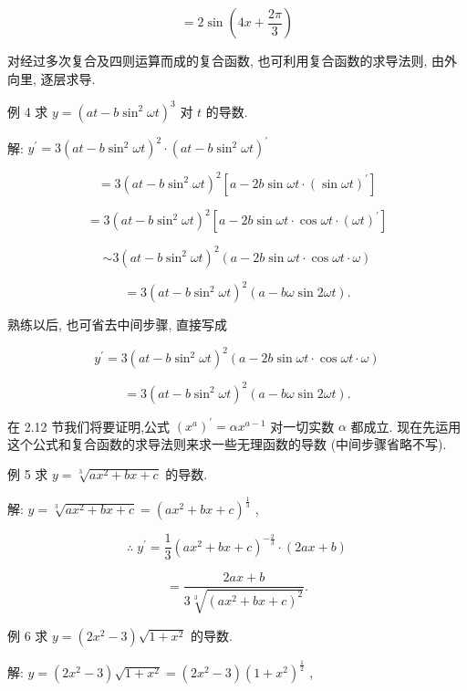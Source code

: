 \documentclass[lang=cn,newtx,10pt,scheme=chinese]{elegantbook}
\begin{document}
\[
= 2\sin \left( {{4x} + \frac{2\pi }{3}}\right)
\]

对经过多次复合及四则运算而成的复合函数, 也可利用复合函数的求导法则, 由外向里, 逐层求导.

例 4 求 \(y = {\left( at - b{\sin }^{2}\omega t\right) }^{3}\) 对 \(t\) 的导数.

解: \({y}^{\prime } = 3{\left( at - b{\sin }^{2}\omega t\right) }^{2} \cdot {\left( at - b{\sin }^{2}\omega t\right) }^{\prime }\)

\[
= 3{\left( at - b{\sin }^{2}\omega t\right) }^{2}\left\lbrack {a - {2b}\sin {\omega t} \cdot {\left( \sin \omega t\right) }^{\prime }}\right\rbrack
\]

\[
= 3{\left( at - b{\sin }^{2}\omega t\right) }^{2}\left\lbrack {a - {2b}\sin {\omega t} \cdot \cos {\omega t} \cdot {\left( \omega t\right) }^{\prime }}\right\rbrack
\]

\[
\sim 3{\left( at - b{\sin }^{2}\omega t\right) }^{2}\left( {a - {2b}\sin {\omega t} \cdot \cos {\omega t} \cdot \omega }\right)
\]

\[
= 3{\left( at - b{\sin }^{2}\omega t\right) }^{2}\left( {a - {b\omega }\sin {2\omega t}}\right) \text{.}
\]

熟练以后, 也可省去中间步骤, 直接写成

\[
{y}^{\prime } = 3{\left( at - b{\sin }^{2}\omega t\right) }^{2}\left( {a - {2b}\sin {\omega t} \cdot \cos {\omega t} \cdot \omega }\right)
\]

\[
= 3{\left( at - b{\sin }^{2}\omega t\right) }^{2}\left( {a - {b\omega }\sin {2\omega t}}\right) \text{.}
\]

在 2.12 节我们将要证明,公式 \({\left( {x}^{a}\right) }^{\prime } = \alpha {x}^{a - 1}\) 对一切实数 \(\alpha\) 都成立. 现在先运用这个公式和复合函数的求导法则来求一些无理函数的导数 (中间步骤省略不写).

例 5 求 \(y = \sqrt[3]{a{x}^{2} + {bx} + c}\) 的导数.

解: \(y = \sqrt[3]{a{x}^{2} + {bx} + c} = {\left( a{x}^{2} + bx + c\right) }^{\frac{1}{3}}\) ,

\[
\therefore \;{y}^{\prime } = \frac{1}{3}{\left( a{x}^{2} + bx + c\right) }^{-\frac{2}{3}} \cdot \left( {{2ax} + b}\right)
\]

\[
= \frac{{2ax} + b}{3\sqrt[3]{{\left( a{x}^{2} + bx + c\right) }^{2}}}.
\]

例 6 求 \(y = \left( {2{x}^{2} - 3}\right) \sqrt{1 + {x}^{2}}\) 的导数.

解: \(y = \left( {2{x}^{2} - 3}\right) \sqrt{1 + {x}^{2}} = \left( {2{x}^{2} - 3}\right) {\left( 1 + {x}^{2}\right) }^{\frac{1}{2}}\) ,
\end{document}
